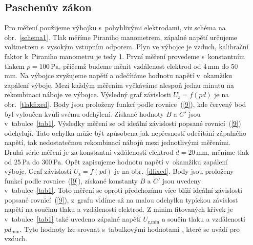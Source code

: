 \documentclass[a4paper,12pt]{article}
\begin{document}
\subsection{Paschenův zákon}
Pro měření použijeme výbojku s~pohyblivými elektrodami, viz schéma na 
obr.~\ref{schema1}. Tlak měříme Piraniho 
manometrem, zápalné napětí určujeme voltmetrem s~vysokým vstupním odporem. Plyn 
ve výbojce je vzduch, kalibrační faktor k~Piraniho manometru je tedy 1. První 
měření provedeme s~konstantním tlakem $p = 100\,\si{\pascal}$, přičemž budeme 
měnit vzdálenost elektrod od 4\,\si{\milli\meter} do 50\,\si{\milli\meter}. Na 
výbojce zvyšujeme napětí a odečítáme hodnotu napětí v~okamžiku zapálení výboje. 
Mezi každým měřením vyčkáváme alespoň jednu minutu na rekombinaci náboje ve 
výbojce. Výsledný graf závislosti $U_\text{z} = f(pd)$ je na 
obr.~\ref{tlakfixed}. 
Body jsou proloženy funkcí podle rovnice~(\ref{9}), kde červený bod byl 
vyloučen kvůli svému odchýlení. Získané hodnoty $B$ 
a $C'$ jsou v~tabulce~\ref{tab1}. Výsledky měření se od ideální závislosti 
popsané 
rovnicí~(\ref{9}) odchylují. Tato ochylka může být způsobena jak 
nepřesností odečítání zápalného napětí, tak nedostatečnou rekombinací nábojů 
mezi jednotlivými měřeními. 
Druhá série měření je za konstantní vzdálenosti elektrod $d = 
20\,\si{\milli\meter}$, 
měníme tlak od 25\,\si{\pascal} do 300\,\si{\pascal}. Opět zapisujeme hodnotu 
napětí v~okamžiku zapálení výboje. Graf závislosti $U_\text{z} = f(pd)$ je na 
obr.~\ref{dfixed}. Body jsou proloženy funkcí podle rovnice~(\ref{9}), získané 
konstanty 
$B$ a $C'$ jsou uvedeny v~tabulce~\ref{tab1}. Toto měření se oproti 
předchozímu více 
blíží ideální závislosti popsané rovnicí~(\ref{9}), z~grafu vidíme až na malou 
odchylku typickou závislost napětí na součinu tlaku a vzdálenosti elektrod.
Z minim fitovaných křivek je v~tabulce~\ref{tab1} také uvedeno zápalné napětí 
$U_\text{z,min}$ a 
součin tlaku a vzdálenosti $pd_{\text{min}}$. Tyto hodnoty 
lze srovnat s~tabulkovými hodnotami \cite{wiki}, které se uvádí pro vzduch.

%
\end{document}
